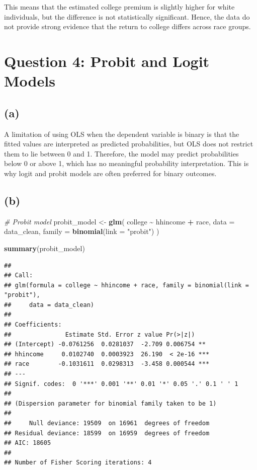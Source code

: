 \documentclass[
]{article}
\newenvironment{Shaded}{\begin{snugshade}}{\end{snugshade}}
\newcommand{\AttributeTok}[1]{\textcolor[rgb]{0.13,0.29,0.53}{#1}}
\newcommand{\CommentTok}[1]{\textcolor[rgb]{0.56,0.35,0.01}{\textit{#1}}}
\newcommand{\FunctionTok}[1]{\textcolor[rgb]{0.13,0.29,0.53}{\textbf{#1}}}
\newcommand{\NormalTok}[1]{#1}
\newcommand{\OtherTok}[1]{\textcolor[rgb]{0.56,0.35,0.01}{#1}}
\newcommand{\SpecialCharTok}[1]{\textcolor[rgb]{0.81,0.36,0.00}{\textbf{#1}}}
\newcommand{\StringTok}[1]{\textcolor[rgb]{0.31,0.60,0.02}{#1}}
\begin{document}
This means that the estimated college premium is slightly higher for
white individuals, but the difference is not statistically significant.
Hence, the data do not provide strong evidence that the return to
college differs across race groups.

\section{Question 4: Probit and Logit
Models}\label{question-4-probit-and-logit-models}

\subsection{(a)}\label{a-2}

A limitation of using OLS when the dependent variable is binary is that
the fitted values are interpreted as predicted probabilities, but OLS
does not restrict them to lie between 0 and 1. Therefore, the model may
predict probabilities below 0 or above 1, which has no meaningful
probability interpretation. This is why logit and probit models are
often preferred for binary outcomes.

\subsection{(b)}\label{b-2}

\begin{Shaded}
\begin{Highlighting}[]
\CommentTok{\# Probit model}
\NormalTok{probit\_model }\OtherTok{\textless{}{-}} \FunctionTok{glm}\NormalTok{(}
\NormalTok{  college }\SpecialCharTok{\textasciitilde{}}\NormalTok{ hhincome }\SpecialCharTok{+}\NormalTok{ race,}
  \AttributeTok{data =}\NormalTok{ data\_clean,}
  \AttributeTok{family =} \FunctionTok{binomial}\NormalTok{(}\AttributeTok{link =} \StringTok{"probit"}\NormalTok{)}
\NormalTok{)}

\FunctionTok{summary}\NormalTok{(probit\_model)}
\end{Highlighting}
\end{Shaded}

\begin{verbatim}
## 
## Call:
## glm(formula = college ~ hhincome + race, family = binomial(link = "probit"), 
##     data = data_clean)
## 
## Coefficients:
##               Estimate Std. Error z value Pr(>|z|)    
## (Intercept) -0.0761256  0.0281037  -2.709 0.006754 ** 
## hhincome     0.0102740  0.0003923  26.190  < 2e-16 ***
## race        -0.1031611  0.0298313  -3.458 0.000544 ***
## ---
## Signif. codes:  0 '***' 0.001 '**' 0.01 '*' 0.05 '.' 0.1 ' ' 1
## 
## (Dispersion parameter for binomial family taken to be 1)
## 
##     Null deviance: 19509  on 16961  degrees of freedom
## Residual deviance: 18599  on 16959  degrees of freedom
## AIC: 18605
## 
## Number of Fisher Scoring iterations: 4
\end{verbatim}
\end{document}
